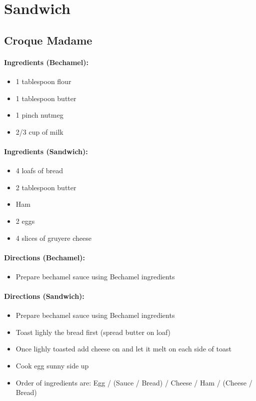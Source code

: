\documentclass{article}
\begin{document}
\section{Sandwich}


\subsection{Croque Madame} 

\paragraph{Ingredients (Bechamel):}
\begin{itemize}
    \item 1 tablespoon flour
    \item 1 tablespoon butter
    \item 1 pinch nutmeg
    \item 2/3 cup of milk
\end{itemize}  

\paragraph{Ingredients (Sandwich):}
\begin{itemize}
    \item 4 loafs of bread
    \item 2 tablespoon butter
    \item Ham
    \item 2 eggs
    \item 4 slices of gruyere cheese
\end{itemize}  

\paragraph{Directions (Bechamel):}
\begin{itemize}
    \item Prepare bechamel sauce using Bechamel ingredients
\end{itemize}  

\paragraph{Directions (Sandwich):}
\begin{itemize}
    \item Prepare bechamel sauce using Bechamel ingredients
    \item Toast lighly the bread first (spread butter on loaf)
    \item Once lighly toasted add cheese on and let it melt on each side of toast
    \item Cook egg sunny side up
    \item Order of ingredients are: Egg / (Sauce / Bread) / Cheese / Ham / (Cheese / Bread)
\end{itemize} 
\end{document}
